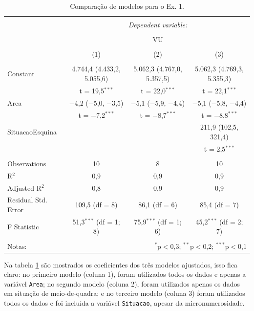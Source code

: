\documentclass[
  a4paper, 11pt]{article}
\begin{document}
\begin{table}[H] \centering 
  \caption{Comparação de modelos para o Ex. 1.} 
  \label{tab:tab1} 
\footnotesize 
\begin{tabular}{@{\extracolsep{5pt}}lccc} 
\\[-1.8ex]\hline 
\hline \\[-1.8ex] 
 & \multicolumn{3}{c}{\textit{Dependent variable:}} \\ 
\cline{2-4} 
\\[-1.8ex] & \multicolumn{3}{c}{VU} \\ 
\\[-1.8ex] & (1) & (2) & (3)\\ 
\hline \\[-1.8ex] 
 Constant & 4.744,4 (4.433,2, 5.055,6) & 5.062,3 (4.767,0, 5.357,5) & 5.062,3 (4.769,3, 5.355,3) \\ 
  & t = 19,5$^{***}$ & t = 22,0$^{***}$ & t = 22,1$^{***}$ \\ 
  Area & $-$4,2 ($-$5,0, $-$3,5) & $-$5,1 ($-$5,9, $-$4,4) & $-$5,1 ($-$5,8, $-$4,4) \\ 
  & t = $-$7,2$^{***}$ & t = $-$8,7$^{***}$ & t = $-$8,8$^{***}$ \\ 
  SituacaoEsquina &  &  & 211,9 (102,5, 321,4) \\ 
  &  &  & t = 2,5$^{***}$ \\ 
 \hline \\[-1.8ex] 
Observations & 10 & 8 & 10 \\ 
R$^{2}$ & 0,9 & 0,9 & 0,9 \\ 
Adjusted R$^{2}$ & 0,8 & 0,9 & 0,9 \\ 
Residual Std. Error & 109,5 (df = 8) & 86,1 (df = 6) & 85,4 (df = 7) \\ 
F Statistic & 51,3$^{***}$ (df = 1; 8) & 75,9$^{***}$ (df = 1; 6) & 45,2$^{***}$ (df = 2; 7) \\ 
\hline 
\hline \\[-1.8ex] 
Notas: & \multicolumn{3}{r}{$^{*}$p$<$0,3; $^{**}$p$<$0,2; $^{***}$p$<$0,1} \\ 
\end{tabular} 
\end{table}

Na tabela \ref{tab:tab1} são mostrados os coeficientes dos três modelos
ajustados, isso fica claro: no primeiro modelo (coluna 1), foram
utilizados todos os dados e apenas a variável \texttt{Area}; no segundo
modelo (coluna 2), foram utilizados apenas os dados em situação de
meio-de-quadra; e no terceiro modelo (coluna 3) foram utilizados todos
os dados e foi incluída a variável \texttt{Situacao}, apesar da
micronumerosidade.
\end{document}
